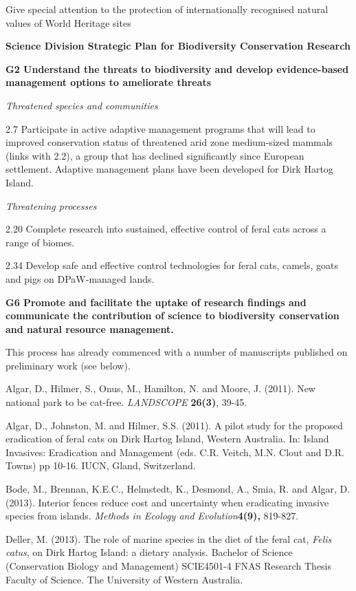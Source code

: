 \documentclass[version=last,
    paper=a4,                               %
    10pt,                                   %
    dvipsnames,
    oneside,                              %
    headings=openany,                       %
    open=any,
    BCOR=7mm,                               %
    DIV=15,     %
]{scrbook}
\begin{document}
Give special attention to the protection of internationally recognised
natural values of World Heritage sites

\textbf{Science Division Strategic Plan for Biodiversity Conservation
Research}

\textbf{G2 Understand the threats to biodiversity and develop
evidence-based management options to ameliorate threats}

\emph{Threatened species and communities}

2.7 Participate in active adaptive management programs that will lead to
improved conservation status of threatened arid zone medium-sized
mammals (links with 2.2), a group that has declined significantly since
European settlement. Adaptive management plans have been developed for
Dirk Hartog Island.

\emph{Threatening processes}

2.20 Complete research into sustained, effective control of feral cats
across a range of biomes.

2.34 Develop safe and effective control technologies for feral cats,
camels, goats and pigs on DPaW-managed lands.

\textbf{G6 Promote and facilitate the uptake of research findings and
communicate the contribution of science to biodiversity conservation and
natural resource management.}

This process has already commenced with a number of manuscripts
published on preliminary work (see below).

Algar, D., Hilmer, S., Onus, M., Hamilton, N. and Moore, J. (2011). New
national park to be cat-free. \emph{LANDSCOPE} \textbf{26(3)}, 39-45.

Algar, D., Johnston, M. and Hilmer, S.S. (2011). A pilot study for the
proposed eradication of feral cats on Dirk Hartog Island, Western
Australia. In: Island Invasives: Eradication and Management (eds. C.R.
Veitch, M.N. Clout and D.R. Towns) pp 10-16. IUCN, Gland, Switzerland.

Bode, M., Brennan, K.E.C., Helmstedt, K., Desmond, A., Smia, R. and
Algar, D. (2013). Interior fences reduce cost and uncertainty when
eradicating invasive species from islands. \emph{Methods in Ecology and
Evolution}\textbf{4(9),} 819-827.

Deller, M. (2013). The role of marine species in the diet of the feral
cat, \emph{Felis catus}, on Dirk Hartog Island: a dietary analysis.
Bachelor of Science (Conservation Biology and Management) SCIE4501-4
FNAS Research Thesis Faculty of Science. The University of Western
Australia.
\end{document}
